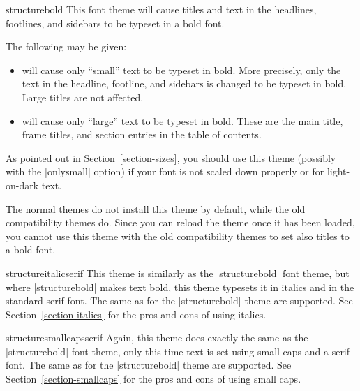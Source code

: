 \begin{fontthemeexample}{structurebold}
  This font theme will cause titles and text in the headlines,
  footlines, and sidebars to be typeset in a bold font.

  The following  may be given:
  \begin{itemize}
  \item
    will cause only ``small'' text to be typeset in bold. More
    precisely, only the text in the headline, footline, and sidebars
    is changed to be typeset in bold. Large titles are not affected.
  \item
    will cause only ``large'' text to be typeset in bold. These are
    the main title, frame titles, and section entries in the table of
    contents.
  \end{itemize}

  As pointed out in Section~\ref{section-sizes}, you should use this
  theme (possibly with the |onlysmall| option) if your font is not
  scaled down properly or for light-on-dark text.

  The normal themes do not install this theme by default, while the
  old compatibility themes do. Since you can reload the theme once it
  has been loaded, you cannot use this theme with the old
  compatibility themes to set also titles to a bold font.
\end{fontthemeexample}

\begin{fontthemeexample}{structureitalicserif}
  This theme is similarly as the |structurebold| font theme, but where
  |structurebold| makes text bold, this theme typesets it in italics and
  in the standard serif font. The same  as for the
  |structurebold| theme are supported. See
  Section~\ref{section-italics} for the pros and cons
  of using italics.
\end{fontthemeexample}

\begin{fontthemeexample}{structuresmallcapsserif}
  Again, this theme does exactly the same as the |structurebold| font theme,
  only this time text is set using small caps and a serif
    font. The same  as for the |structurebold| theme are
  supported. See Section~\ref{section-smallcaps} for the pros and cons
  of using small caps.
\end{fontthemeexample}






